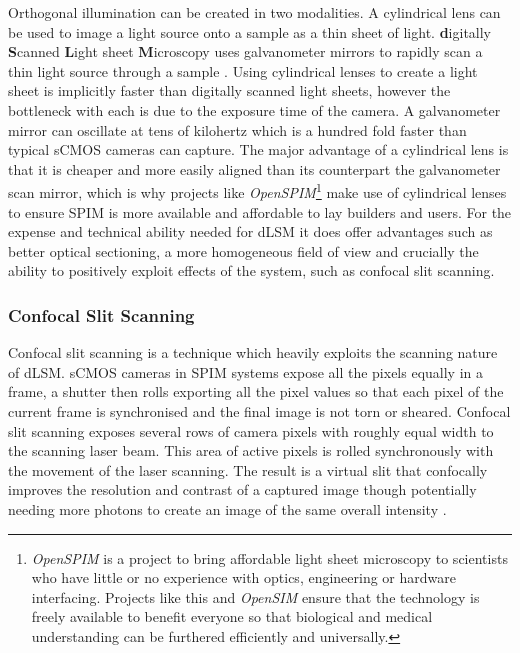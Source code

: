 Orthogonal illumination can be created in two modalities. A cylindrical lens can be used to image a light source onto a sample as a thin sheet of light. \textbf{d}igitally \textbf{S}canned \textbf{L}ight sheet \textbf{M}icroscopy uses galvanometer mirrors to rapidly scan a thin light source through a sample \cite{Keller2008}. Using cylindrical lenses to create a light sheet is implicitly faster than digitally scanned light sheets, however the bottleneck with each is due to the exposure time of the camera. %
A galvanometer mirror can oscillate at tens of kilohertz which is a hundred fold faster than typical sCMOS cameras can capture. The major advantage of a cylindrical lens is that it is cheaper and more easily aligned than its counterpart the galvanometer scan mirror, which is why projects like \textit{OpenSPIM}\footnote{\textit{OpenSPIM} is a project to bring affordable light sheet microscopy to scientists who have little or no experience with optics, engineering or hardware interfacing. Projects like this and \textit{OpenSIM} ensure that the technology is freely available to benefit everyone so that biological and medical understanding can be furthered efficiently and universally.}\cite{Gualda2013,Pitrone2013} make use of cylindrical lenses to ensure SPIM is more available and affordable to lay builders and users. For the expense and technical ability needed for dLSM it does offer advantages such as better optical sectioning, a more homogeneous field of view and crucially the ability to positively exploit effects of the system, such as confocal slit scanning.

\subsubsection{Confocal Slit Scanning}

Confocal slit scanning is a technique which heavily exploits the scanning nature of dLSM. sCMOS cameras in SPIM systems expose all the pixels equally in a frame, a shutter then rolls exporting all the pixel values so that each pixel of the current frame is synchronised and the final image is not torn or sheared.  Confocal slit scanning exposes several rows of camera pixels with roughly equal width to  the scanning laser beam. This area of active pixels is rolled synchronously with the movement of the laser scanning. The result is a virtual slit that confocally improves the resolution and contrast of a captured image though potentially needing more photons to create an image of the same overall intensity \cite{Baumgart2012}.

